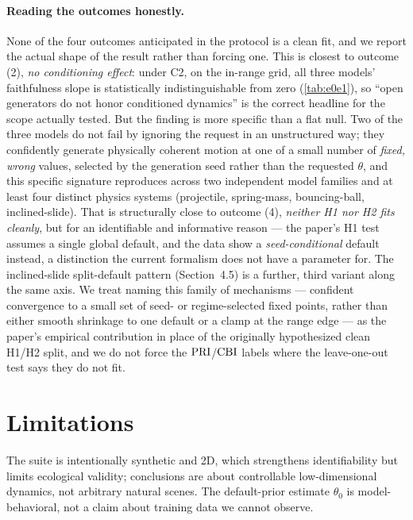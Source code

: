 \paragraph{Reading the outcomes honestly.}
None of the four outcomes anticipated in the protocol is a clean fit, and we
report the actual shape of the result rather than forcing one. This is
closest to outcome (2), \emph{no conditioning effect}: under C2, on the
in-range grid, all three models' faithfulness slope is statistically
indistinguishable from zero (\autoref{tab:e0e1}), so ``open generators do not
honor conditioned dynamics'' is the correct headline for the scope actually
tested. But the finding is more specific than a flat null. Two of the three
models do not fail by ignoring the request in an unstructured way; they
confidently generate physically coherent motion at one of a small number of
\emph{fixed, wrong} values, selected by the generation seed rather than the
requested $\theta$, and this specific signature reproduces across two
independent model families and at least four distinct physics systems
(projectile, spring-mass, bouncing-ball, inclined-slide). That is structurally
close to outcome (4), \emph{neither H1 nor H2 fits cleanly}, but for an
identifiable and informative reason --- the paper's H1 test assumes a single
global default, and the data show a \emph{seed-conditional} default instead,
a distinction the current formalism does not have a parameter for. The
inclined-slide split-default pattern (Section~4.5) is a further, third
variant along the same axis. We treat naming this family of mechanisms ---
confident convergence to a small set of seed- or regime-selected fixed
points, rather than either smooth shrinkage to one default or a clamp at the
range edge --- as the paper's empirical contribution in place of the
originally hypothesized clean H1/H2 split, and we do not force the
$\mathrm{PRI}$/$\mathrm{CBI}$ labels where the leave-one-out test says they do not fit.

\section{Limitations}
\label{sec:limitations}
The suite is intentionally synthetic and 2D, which strengthens identifiability
but limits ecological validity; conclusions are about controllable
low-dimensional dynamics, not arbitrary natural scenes. The default-prior
estimate $\theta_0$ is model-behavioral, not a claim about training data we
cannot observe.

